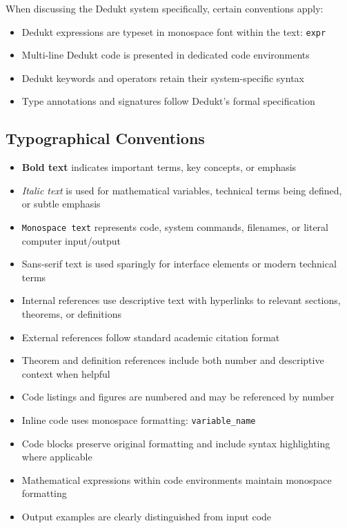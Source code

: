 When discussing the Dedukt system specifically, certain conventions apply:
\begin{itemize}
    \item Dedukt expressions are typeset in monospace font within the text: \texttt{expr}
    \item Multi-line Dedukt code is presented in dedicated code environments
    \item Dedukt keywords and operators retain their system-specific syntax
    \item Type annotations and signatures follow Dedukt's formal specification
\end{itemize}

\subsection*{Typographical Conventions}\label{subsec:typographical-conventions}
\begin{itemize}
    \item \textbf{Bold text} indicates important terms, key concepts, or emphasis
    \item \textit{Italic text} is used for mathematical variables, technical terms being defined, or subtle emphasis
    \item \texttt{Monospace text} represents code, system commands, filenames, or literal computer input/output
    \item \textsf{Sans-serif text} is used sparingly for interface elements or modern technical terms
\end{itemize}

\begin{itemize}
    \item Internal references use descriptive text with hyperlinks to relevant sections, theorems, or definitions
    \item External references follow standard academic citation format
    \item Theorem and definition references include both number and descriptive context when helpful
    \item Code listings and figures are numbered and may be referenced by number
\end{itemize}

\begin{itemize}
    \item Inline code uses monospace formatting: \texttt{variable\_name}
    \item Code blocks preserve original formatting and include syntax highlighting where applicable
    \item Mathematical expressions within code environments maintain monospace formatting
    \item Output examples are clearly distinguished from input code
\end{itemize}

